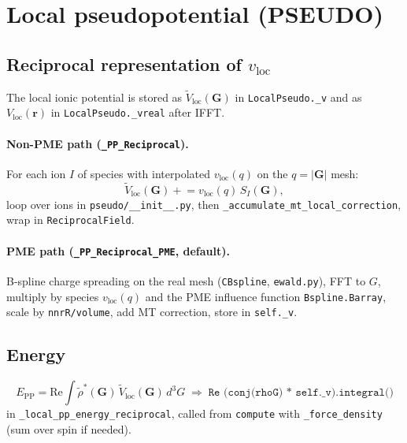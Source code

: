 \documentclass[11pt,a4paper]{article}
\begin{document}
\section{Local pseudopotential (PSEUDO)}

\subsection{Reciprocal representation of $v_{\mathrm{loc}}$}

The local ionic potential is stored as $\tilde V_{\mathrm{loc}}(\mathbf G)$ in \texttt{LocalPseudo.\_v}
and as $V_{\mathrm{loc}}(\mathbf r)$ in \texttt{LocalPseudo.\_vreal} after IFFT.

\paragraph{Non-PME path (\texttt{\_PP\_Reciprocal}).}
For each ion $I$ of species with interpolated $v_{\mathrm{loc}}(q)$ on the $q=|\mathbf G|$ mesh:
\begin{equation}
  \tilde V_{\mathrm{loc}}(\mathbf G) \mathrel{+}= v_{\mathrm{loc}}(q)\,S_I(\mathbf G),
\end{equation}
loop over ions in \texttt{pseudo/\_\_init\_\_.py}, then \texttt{\_accumulate\_mt\_local\_correction},
wrap in \texttt{ReciprocalField}.

\paragraph{PME path (\texttt{\_PP\_Reciprocal\_PME}, default).}
B-spline charge spreading on the real mesh (\texttt{CBspline}, \texttt{ewald.py}), FFT to $G$,
multiply by species $v_{\mathrm{loc}}(q)$ and the PME influence function \texttt{Bspline.Barray},
scale by \texttt{nnrR/volume}, add MT correction, store in \texttt{self.\_v}.

\subsection{Energy}

\begin{equation}
  E_{\mathrm{PP}} = \mathrm{Re}\int \tilde\rho^*(\mathbf G)\,\tilde V_{\mathrm{loc}}(\mathbf G)\,d^3G
  \;\Rightarrow\;
  \texttt{Re (conj(rhoG) * self.\_v).integral()}
\end{equation}
in \texttt{\_local\_pp\_energy\_reciprocal}, called from \texttt{compute} with
\texttt{\_force\_density} (sum over spin if needed).
\end{document}
